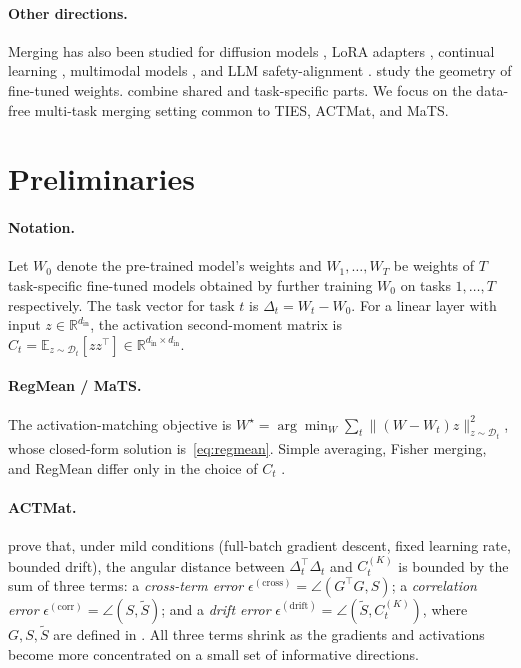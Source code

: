 \documentclass{article} %
\newcommand{\ws}{W^\star}
\begin{document}
\paragraph{Other directions.} Merging has also been studied for diffusion models \citep{nair2024diffmerge}, LoRA adapters \citep{zhang2024loremerging,huang2024lorahub}, continual learning \citep{continualmerge2025,nullspace2025}, multimodal models \citep{sung2023empirical}, and LLM safety-alignment \citep{bhardwaj2024language}. \citet{gueta2023knowledge} study the geometry of fine-tuned weights. \citet{twinmerging2024} combine shared and task-specific parts. We focus on the data-free multi-task merging setting common to TIES, ACTMat, and MaTS.

\section{Preliminaries}

\paragraph{Notation.} Let $W_0$ denote the pre-trained model's weights and $W_1,\ldots,W_T$ be weights of $T$ task-specific fine-tuned models obtained by further training $W_0$ on tasks $1,\ldots,T$ respectively. The task vector for task $t$ is $\Delta_t = W_t - W_0$. For a linear layer with input $z \in \mathbb{R}^{d_\text{in}}$, the activation second-moment matrix is $C_t = \mathbb{E}_{z\sim\mathcal{D}_t}[z z^\top] \in \mathbb{R}^{d_\text{in}\times d_\text{in}}$.

\paragraph{RegMean / MaTS.} The activation-matching objective is $\ws = \arg\min_W \sum_t \|(W-W_t)z\|^2_{z\sim \mathcal{D}_t}$, whose closed-form solution is~\eqref{eq:regmean}. Simple averaging, Fisher merging, and RegMean differ only in the choice of $C_t$ \citep{tam2024mats}.

\paragraph{ACTMat.} \citet{hameed2025actmat} prove that, under mild conditions (full-batch gradient descent, fixed learning rate, bounded drift), the angular distance between $\Delta_t^\top\Delta_t$ and $C_t^{(K)}$ is bounded by the sum of three terms: a \emph{cross-term error} $\epsilon^{(\text{cross})} = \angle(G^\top G, S)$; a \emph{correlation error} $\epsilon^{(\text{corr})} = \angle(S, \tilde S)$; and a \emph{drift error} $\epsilon^{(\text{drift})} = \angle(\tilde S, C_t^{(K)})$, where $G,S,\tilde S$ are defined in \citet[Theorem 3.1]{hameed2025actmat}. All three terms shrink as the gradients and activations become more concentrated on a small set of informative directions.
\end{document}
